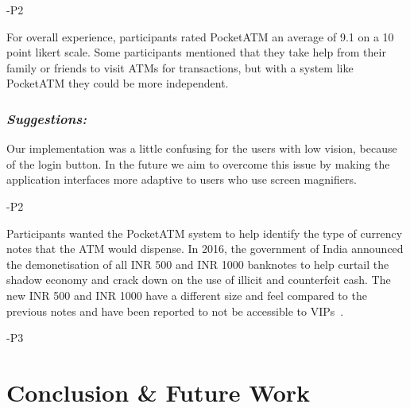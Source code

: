\textcolor{quotegray}{ -P2}

For overall experience, participants rated PocketATM an average of 9.1 on a 10 point likert scale. Some participants mentioned that they take help from their family or friends to visit ATMs for transactions, but with a system like PocketATM they could be more independent. 

\subsubsection*{\textit{\textbf{Suggestions:}}}
\label{sssec:suggestions}

Our implementation was a little confusing for the users with low vision, because of the login button. In the future we aim to overcome this issue by making the application interfaces more adaptive to users who use screen magnifiers.

\textcolor{quotegray}{ -P2}

Participants wanted the PocketATM system to help identify the type of currency notes that the ATM would dispense. In 2016, the government of India announced the demonetisation of all INR 500 and INR 1000 banknotes to help curtail the shadow economy and crack down on the use of illicit and counterfeit cash. The new INR 500 and INR 1000 have a  different size and feel compared to the previous notes and have been reported to not be accessible to VIPs~\cite{HTArticle}.

\textcolor{quotegray}{ -P3}

\section{Conclusion \& Future Work}
\label{sec:conclusion}

